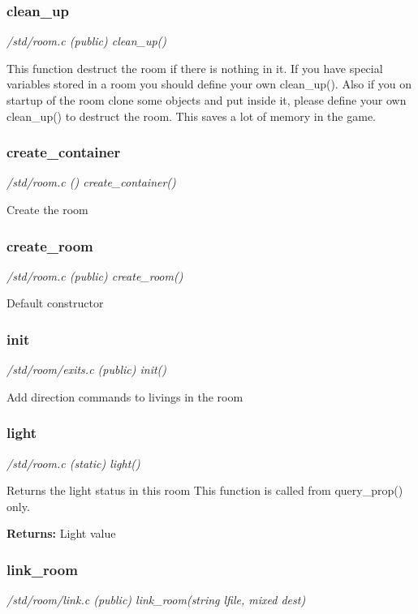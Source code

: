 \subsubsection{clean\_up}

{\em /std/room.c (public) clean\_up()}

This function destruct the room if there is nothing in it.
If you have special variables stored in a room you should
define your own clean\_up(). Also if you on startup of the
room clone some objects and put inside it, please define
your own clean\_up() to destruct the room. This saves a
lot of memory in the game.


\subsubsection{create\_container}

{\em /std/room.c () create\_container()}

Create the room


\subsubsection{create\_room}

{\em /std/room.c (public) create\_room()}

Default constructor


\subsubsection{init}

{\em /std/room/exits.c (public) init()}

Add direction commands to livings in the room


\subsubsection{light}

{\em /std/room.c (static) light()}

Returns the light status in this room
This function is called from query\_prop() only.

{\bf Returns:}    Light value


\subsubsection{link\_room}

{\em /std/room/link.c (public) link\_room(string lfile, mixed dest)}

